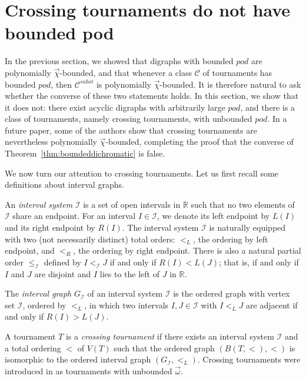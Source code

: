 \documentclass{article}
\newcommand{\dic}{\vec\chi}
\newcommand{\diomega}{\vec\omega}
\begin{document}

\section{Crossing tournaments do not have bounded pod}
\label{sec:crossingtournaments}

In the previous section, we showed that digraphs with bounded $pod$ are polynomially $\dic$-bounded, and that whenever a class $\mathcal{C}$ of tournaments has bounded $pod$, then $\mathcal{C}^{subst}$ is polynomially $\dic$-bounded. It is therefore natural to ask whether the converse of these two statements holds. In this section, we show that it does not: there exist acyclic digraphs with arbitrarily large $pod$, and there is a class of tournaments, namely crossing tournaments, with unbounded $pod$. In a future paper, some of the authors show that crossing tournaments are nevertheless polynomially $\dic$-bounded, completing the proof that the converse of Theorem~\ref{thm:boundeddichromatic} is false.











We now turn our attention to crossing tournaments. Let us first recall some definitions about interval graphs.  

An \textit{interval system} $\mathcal{I}$ is a set of open intervals in $\mathbb{R}$ such that no two elements of $\mathcal{I}$ share an endpoint. For an interval $I \in \mathcal{I}$, we denote its left endpoint by $L(I)$ and its right endpoint by $R(I)$. The interval system $\mathcal{I}$ is naturally equipped with two (not necessarily distinct) total orders: $<_L$, the ordering by left endpoint, and $<_R$, the ordering by right endpoint. There is also a natural partial order $\leq_{\mathcal I}$ defined by $I <_{\mathcal I} J$ if and only if $R(I) < L(J)$; that is, if and only if $I$ and $J$ are disjoint and $I$ lies to the left of $J$ in $\mathbb{R}$.

The \textit{interval graph} $G_{\mathcal I}$ of an interval system $\mathcal I$ is the ordered graph with vertex set $\mathcal I$, ordered by $<_L$, in which two intervals $I,J \in \mathcal I$ with $I <_L J$ are adjacent if and only if $R(I) > L(J)$.

A tournament $T$ is a \textit{crossing tournament} if there exists an interval system $\mathcal I$ and a total ordering $<$ of $V(T)$ such that the ordered graph $(B(T,<),<)$ is isomorphic to the ordered interval graph $(G_{\mathcal I},<_L)$. Crossing tournaments were introduced in \cite{crossing} as tournaments with unbounded $\diomega$.
\end{document}
